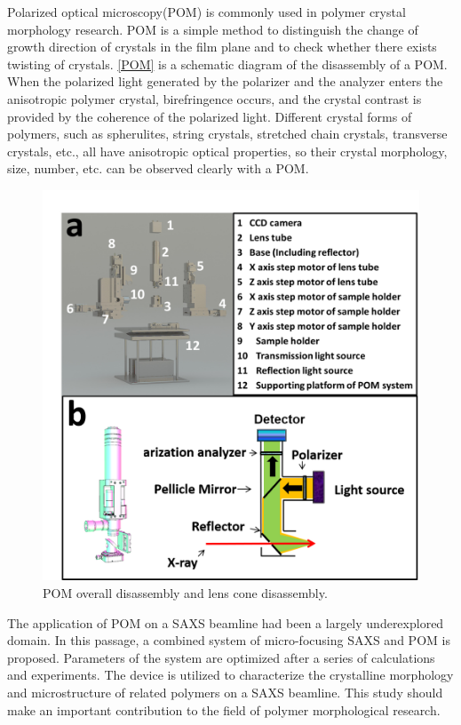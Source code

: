 \documentclass{Head}
\begin{document}
Polarized optical microscopy(POM) is commonly used in polymer crystal morphology research.
POM is a simple method to distinguish the change of growth direction of crystals in the film plane and to check whether there exists twisting of crystals\cite{RN37}.
\autoref{POM} is a schematic diagram of the disassembly of a POM.
When the polarized light generated by the polarizer and the analyzer enters the anisotropic polymer crystal, birefringence occurs, and the crystal contrast is provided by the coherence of the polarized light.
Different crystal forms of polymers, such as spherulites, string crystals, stretched chain crystals, transverse crystals, etc., all have anisotropic optical properties, so their crystal morphology, size, number, etc. can be observed clearly with a POM.
\begin{figure}
    \centering
    \includegraphics[scale=0.4]{Figures/Fig3POM.png}
    \caption{POM overall disassembly and lens cone disassembly.}
    \label{POM}
\end{figure}


The application of POM on a SAXS beamline had been a largely underexplored domain.
In this passage, a combined system of micro-focusing SAXS and POM is proposed.
Parameters of the system are optimized after a series of calculations and experiments.
The device is utilized to characterize the crystalline morphology and microstructure of related polymers on a SAXS beamline.
This study should make an important contribution to the field of polymer morphological research.
\end{document}
